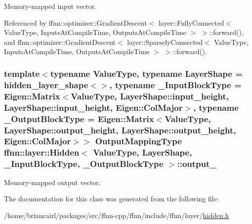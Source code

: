 Memory-\/mapped input vector. 



Referenced by ffnn\-::optimizer\-::\-Gradient\-Descent$<$ layer\-::\-Fully\-Connected$<$ Value\-Type, Inputs\-At\-Compile\-Time, Outputs\-At\-Compile\-Time $>$ $>$\-::forward(), and ffnn\-::optimizer\-::\-Gradient\-Descent$<$ layer\-::\-Sparsely\-Connected$<$ Value\-Type, Inputs\-At\-Compile\-Time, Outputs\-At\-Compile\-Time $>$ $>$\-::forward().

\hypertarget{classffnn_1_1layer_1_1_hidden_adf9818c784dccc1860fe8384264cc4be}{
\subsubsection[{output\-\_\-}]{\setlength{\rightskip}{0pt plus 5cm}template$<$typename Value\-Type, typename Layer\-Shape = hidden\-\_\-layer\-\_\-shape$<$$>$, typename \-\_\-\-Input\-Block\-Type = Eigen\-::\-Matrix$<$\-Value\-Type, Layer\-Shape\-::input\-\_\-height, Layer\-Shape\-::input\-\_\-height, Eigen\-::\-Col\-Major$>$, typename \-\_\-\-Output\-Block\-Type = Eigen\-::\-Matrix$<$\-Value\-Type, Layer\-Shape\-::output\-\_\-height, Layer\-Shape\-::output\-\_\-height, Eigen\-::\-Col\-Major$>$$>$ {\bf Output\-Mapping\-Type} {\bf ffnn\-::layer\-::\-Hidden}$<$ Value\-Type, Layer\-Shape, \-\_\-\-Input\-Block\-Type, \-\_\-\-Output\-Block\-Type $>$\-::output\-\_\-\hspace{0.3cm}{\ttfamily [protected]}}}\label{classffnn_1_1layer_1_1_hidden_adf9818c784dccc1860fe8384264cc4be}


Memory-\/mapped output vector. 



The documentation for this class was generated from the following file\-:\begin{DoxyCompactItemize}
\item 
/home/briancairl/packages/src/ffnn-\/cpp/ffnn/include/ffnn/layer/\hyperlink{hidden_8h}{hidden.\-h}\end{DoxyCompactItemize}
